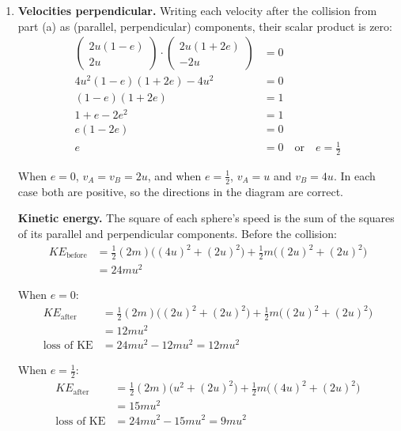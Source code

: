 \documentclass[leqno]{article}
\begin{document}
\begin{enumerate}[
  label=\textbf{\arabic*.},
  leftmargin=*,
  topsep=0pt,
  partopsep=0pt,
  parsep=0pt
]
\begin{djsSolution}
\begin{enumerate}[label=\textbf{(\alph*)}, start=1]
\item \textbf{Velocities perpendicular.} Writing each velocity after the collision from part (a) as (parallel, perpendicular) components, their scalar product is zero:
\begin{align*}
\begin{pmatrix}2u(1-e)\\2u\end{pmatrix}\cdot\begin{pmatrix}2u(1+2e)\\-2u\end{pmatrix}&=0\\
4u^2(1-e)(1+2e)-4u^2&=0\\
(1-e)(1+2e)&=1\\
1+e-2e^2&=1\\
e(1-2e)&=0\\
e&=0\quad\text{or}\quad e=\frac12
\end{align*}

When \(e=0\), \(v_A=v_B=2u\), and when \(e=\frac12\), \(v_A=u\) and \(v_B=4u\). In each case both are positive, so the directions in the diagram are correct.

\textbf{Kinetic energy.} The square of each sphere's speed is the sum of the squares of its parallel and perpendicular components. Before the collision:
\begin{align*}
KE_{\text{before}}&=\frac12(2m)\bigl((4u)^2+(2u)^2\bigr)+\frac12m\bigl((2u)^2+(2u)^2\bigr)\\
&=24mu^2
\end{align*}

When \(e=0\):
\begin{align*}
KE_{\text{after}}&=\frac12(2m)\bigl((2u)^2+(2u)^2\bigr)+\frac12m\bigl((2u)^2+(2u)^2\bigr)\\
&=12mu^2\\
\text{loss of KE}&=24mu^2-12mu^2=12mu^2
\end{align*}

When \(e=\frac12\):
\begin{align*}
KE_{\text{after}}&=\frac12(2m)\bigl(u^2+(2u)^2\bigr)+\frac12m\bigl((4u)^2+(2u)^2\bigr)\\
&=15mu^2\\
\text{loss of KE}&=24mu^2-15mu^2=9mu^2
\end{align*}

\end{enumerate}
\end{djsSolution}

\newpage


\end{enumerate}
\end{document}
